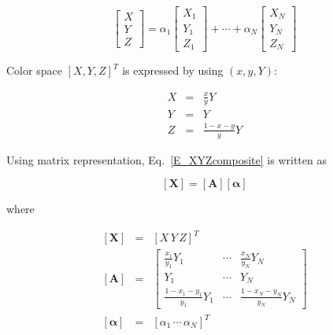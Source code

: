 \documentclass[dvipdfmx,a4paper]{article}
\begin{document}
\begin{equation}
  \label{E_XYZcomposite}
  \left[
    \begin{array}{c}
      X \\
      Y \\
      Z
    \end{array}
  \right]
   = \alpha_1
  \left[
    \begin{array}{c}
        X_1 \\
        Y_1 \\
        Z_1
    \end{array}
  \right]
   + \cdots + \alpha_N
  \left[
    \begin{array}{c}
        X_N \\
        Y_N \\
        Z_N
    \end{array}
  \right]
\end{equation}

Color space $[X, Y, Z]^T$ is expressed by using $(x, y, Y)$:

\begin{eqnarray}
  \label{E_xyY2XYZ}
  X & = & \frac{x}{y}  Y \\
  Y & = & Y \\
  Z & = & \frac{1 - x - y}{y} Y
\end{eqnarray}

Using matrix representation, Eq.~\eqref{E_XYZcomposite} is written as

\begin{equation}
  \label{E_X=AY}
  \left[ \boldsymbol{X} \right] =
  \left[ \boldsymbol{A} \right]
  \left[ \boldsymbol{\alpha} \right]
\end{equation}

\noindent
where

\begin{eqnarray}
  \left[ \boldsymbol{X} \right] &=&
  \left[ X \, Y \, Z \right]^T \label{E_XYZ^T} \\
%
  \left[ \boldsymbol{A} \right] &=&
  \left[
    \begin{array}{ccc}
      \frac{x_1}{y_1} Y_1 & \cdots & \frac{x_N}{y_N} Y_N \\
      Y_1 & \cdots & Y_N \\
      \frac{1 - x_1 - y_1}{y_1}Y_1 & \cdots & \frac{1 - x_N - y_N}{y_N}Y_N
    \end{array}
  \right] \\
%
  \left[ \boldsymbol{\alpha} \right] &=&
  \left[ \alpha_1\, \cdots\, \alpha_N \right]^T
\end{eqnarray}
\end{document}
